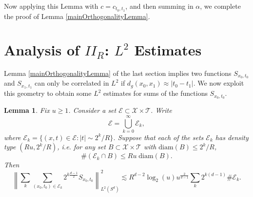 \documentclass[dvipsnames,letterpaper,12pt]{article}
\newtheorem{lemma}[theorem]{Lemma}
\begin{document}
\begin{comment}
%
\[ R^{\frac{d+1}{2}} \int \int_{E_{x_0}} \int_{F_y^{-1}(E_{x_0})} c_{t_0,t_1}(s) \eta(s,y,z) (\partial^{\frac{d-1}{2}} \widehat{\chi} )(R(s + |z|))\; dz\; dy\; ds. \]
%
TODO: Does integrating by parts in the $t$ and $t'$ variable do anything for us? Is this where we need oscillation. If $|t_0 - t_1 + d_g(x_0,x_1)| \geq 10/R$, then we conclude this quantity is
%
\begin{align*}
    & O_N \Big( R^{\frac{d+1}{2}-N} \int \int_{E_{x_0}} \int_{F_y^{-1}(E_{x_0})} |c_{t_0,t_1}(s)| |\eta(s,y,z)| (s + |z|)^{-N}\; dz\; dy\; ds \Big)\\
    &\quad\quad O_N \Big( R^{\frac{d+1}{2} - N} |t_0 - t_1 + d_g(x_0,x_1)|^{-N} |E_{x_0}| |E_{x_1}| \| c_{t_0,t_1} \|_{L^1} \Big)
\end{align*}
%
If $|E_{x_0}|$ and $|E_{x_1}|$ are both proportional to $1/R^d$, then this quantity is
%
\begin{align*}
    & O_N \Big( R^{-\frac{3d-1}{2} - N} |t_0 - t_1 + d_g(x_0,x_1)|^{-N} \| c_{t_0,t_1} \|_{L^1} \Big)\\
    &\quad = O_N \Big( R^{-\frac{3d-1}{2} - 1/p^* - N} (t_0 - t_1 + d_g(x_0,x_1))^{-N} \| b_{t_0} \|_{L^p} \| b_{t_1} \|_{L^p} \Big)\\
    &\quad = O_N \Big( t_0^{s_p} t_1^{s_p} R^{-\frac{3d-1}{2} - 1/p^* - N} (t_0 - t_1 + d_g(E_{x_0}, E_{x_1}))^{-N} \Big)
\end{align*}

\end{comment}

Now applying this Lemma with $c = c_{t_0,t_1}$, and then summing in $\alpha$, we complete the proof of Lemma \ref{mainOrthogonalityLemma}.


\section{Analysis of $II_R$: $L^2$ Estimates}

Lemma \ref{mainOrthogonalityLemma} of the last section implies two functions ${S\!}_{x_0,t_0}$ and ${S\!}_{x_1,t_1}$ can only be correlated in $L^2$ if $d_g(x_0,x_1) \approx |t_0 - t_1|$. We now exploit this geometry to obtain some $L^2$ estimates for sums of the functions ${S\!}_{x_0,t_0}$.

\begin{lemma}
    Fix $u \geq 1$. Consider a set $\mathcal{E} \subset \mathcal{X} \times \mathcal{T}$. Write
    \[ \mathcal{E} = \bigcup_{k = 0}^\infty \mathcal{E}_k, \]
    where $\mathcal{E}_k = \{ (x,t) \in \mathcal{E}: |t| \sim 2^k / R \}$. Suppose that each of the sets $\mathcal{E}_k$ has density type $(Ru,2^k / R)$, i.e. for any set $B \subset \mathcal{X} \times \mathcal{T}$ with $\text{diam}(B) \leq 2^k / R$,
    \[ \#( \mathcal{E}_k \cap B ) \leq Ru\; \text{diam}(B). \]
    Then
    \[ \left\| \sum_k \sum_{(x_0,t_0) \in \mathcal{E}_k} 2^{k \frac{d-1}{2}} {S\!}_{x_0,t_0} \right\|_{L^2(S^d)}^2 \lesssim R^{d-2} \log_2(u) u^{\frac{2}{d-1}} \sum_k 2^{k(d-1)} \# \mathcal{E}_k. \]
\end{lemma}
\end{document}
